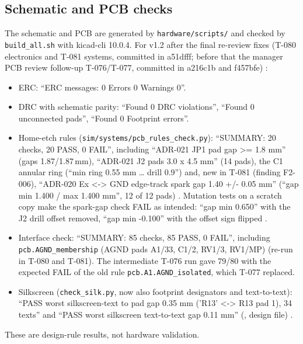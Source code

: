 \subsection{Schematic and PCB checks}
The schematic and PCB are generated by \nolinkurl{hardware/scripts/} and checked by
\texttt{build\_all.sh} with kicad-cli 10.0.4. For v1.2 after the final re-review
fixes (T-080 electronics and T-081 systems, committed in a51dfff; before that the
manager PCB review follow-up T-076/T-077, committed in a216c1b and f457bfe)
 
:
\begin{itemize}[noitemsep]
  \item ERC: ``ERC messages: 0 Errors 0 Warnings 0''.
  \item DRC with schematic parity: ``Found 0 DRC violations'', ``Found 0 unconnected
        pads'', ``Found 0 Footprint errors''.
  \item Home-etch rules (\nolinkurl{sim/systems/pcb_rules_check.py}): ``SUMMARY: 20
        checks, 20 PASS, 0 FAIL'', including ``ADR-021 JP1 pad gap >= 1.8 mm'' (gaps
        1.87/1.87\,mm), ``ADR-021 J2 pads 3.0 x 4.5 mm'' (14 pads), the C1 annular
        ring (``min ring 0.55 mm \ldots{} drill 0.9'') and, new in T-081 (finding
        F2-006), ``ADR-020 Ex <-> GND edge-track spark gap 1.40 +/- 0.05 mm'' (``gap min
        1.400 / max 1.400 mm'', 12 of 12 pads) .
        Mutation tests on a scratch copy make the spark-gap check FAIL as intended:
        ``gap min 0.650'' with the J2 drill offset removed, ``gap min -0.100'' with the
        offset sign flipped .
  \item Interface check: ``SUMMARY: 85 checks, 85 PASS, 0 FAIL'', including
        \nolinkurl{pcb.AGND_membership} (AGND pads A1/33, C1/2, RV1/3, RV1/MP)
         (re-run in T-080 and T-081). The intermediate T-076 run gave 79/80
        with the expected FAIL of the old rule \nolinkurl{pcb.A1.AGND_isolated}, which
        T-077 replaced.
  \item Silkscreen (\nolinkurl{check_silk.py}, now also footprint designators and
        text-to-text): ``PASS worst silkscreen-text to pad gap 0.35 mm ('R13' <-> R13
        pad 1), 34 texts'' and ``PASS worst silkscreen text-to-text gap 0.11 mm''
        (, design file) .
\end{itemize}
These are design-rule results, not hardware validation.

